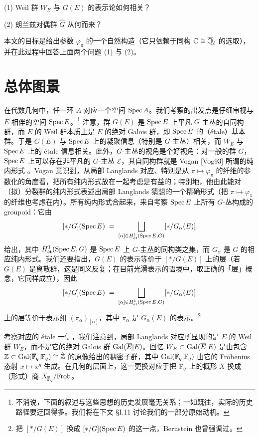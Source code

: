 (1) Weil 群 $W_E$ 与 $G(E)$ 的表示论如何相关？

(2) 朗兰兹对偶群 $\widehat{G}$ 从何而来？

本文的目标是给出参数 $\varphi_\pi$ 的一个自然构造（它只依赖于同构 $\mathbb{C}\cong\overline{\mathbb{Q}}_\ell$ 的选取），并在此过程中回答上面两个问题 (1) 与 (2)。

\section{总体图景}%

\leavevmode{}在代数几何中，任一环 $A$ 对应一个空间 $\operatorname{Spec} A$。我们考察的出发点是仔细审视与 $E$ 相伴的空间 $\operatorname{Spec} E$。\footnote{不消说，下面的叙述与这些思想的历史发展毫无关系；一如既往，实际的历史路径要迂回得多。我们将在下文 §I.11 讨论我们的一部分原始动机。} 注意，群 $G(E)$ 是 $\operatorname{Spec} E$ 上平凡 $G$-主丛的自同构群，而 $E$ 的 Weil 群本质上是 $E$ 的绝对 Galois 群，即 $\operatorname{Spec} E$ 的（étale）基本群。于是 $G(E)$ 与 $\operatorname{Spec} E$ 上的凝聚信息（特别是 $G$-主丛）相关，而 $W_E$ 与 $\operatorname{Spec} E$ 上的 étale 信息相关。此外，$G$-主丛的视角是个好视角：对一般的群 $G$，$\operatorname{Spec} E$ 上可以存在非平凡的 $G$-主丛 $\mathcal{E}$，其自同构群就是 Vogan [Vog93] 所谓的纯内形式
。Vogan 意识到，从局部 Langlands 对应、特别是从 $\pi\mapsto\varphi_\pi$ 的纤维的参数化的角度看，把所有纯内形式放在一起考虑是有益的；特别地，他由此能对（拟）分裂群的纯内形式表述出局部 Langlands 猜想的一个精确形式（把 $\pi\mapsto\varphi_\pi$ 的纤维也考虑在内）。所有纯内形式合起来，来自考察 $\operatorname{Spec} E$ 上所有 $G$-丛构成的 groupoid：它由
\[
  [\ast/G](\operatorname{Spec} E) \;=\; \bigsqcup_{[\alpha]\in H^1_{\text{ét}}(\operatorname{Spec} E,G)} [\ast/G_\alpha(E)]
\]
给出，其中 $H^1_{\text{ét}}(\operatorname{Spec} E,G)$ 是 $\operatorname{Spec} E$ 上 $G$-主丛的同构类之集，而 $G_\alpha$ 是 $G$ 的相应纯内形式。我们还要指出，$G(E)$ 的表示等价于 $[\ast/G(E)]$ 上的层（若 $G(E)$ 是离散群，这是同义反复；在目前光滑表示的语境中，取正确的「层」概念，它同样成立），因此
\[
  [\ast/G](\operatorname{Spec} E) \;=\; \bigsqcup_{[\alpha]\in H^1_{\text{ét}}(\operatorname{Spec} E,G)} [\ast/G_\alpha(E)]
\]
上的层等价于表示组 $(\pi_\alpha)_{[\alpha]}$，其中 $\pi_\alpha$ 是 $G_\alpha(E)$ 的表示。\footnote{把 $[\ast/G(E)]$ 换成 $[\ast/G](\operatorname{Spec} E)$ 的这一点，Bernstein 也曾强调过。}

考察对应的 étale 一侧，我们注意到，局部 Langlands 对应所显现的是 $E$ 的 Weil 群 $W_E$，而不是它的绝对 Galois 群 $\operatorname{Gal}(\overline{E}|E)$。回忆 $W_E\subset\operatorname{Gal}(\overline{E}|E)$ 是由包含 $\mathbb{Z}\subset\operatorname{Gal}(\overline{\mathbb{F}}_q|\mathbb{F}_q)\cong\hat{\mathbb{Z}}$ 的原像给出的稠密子群，其中 $\operatorname{Gal}(\overline{\mathbb{F}}_q|\mathbb{F}_q)$ 由它的 Frobenius 态射 $x\mapsto x^q$ 生成。在几何的层面上，这一更换对应于把 $\mathbb{F}_q$ 上的概形 $X$ 换成（形式）商 $X_{\overline{\mathbb{F}}_q}/\mathrm{Frob}$。

